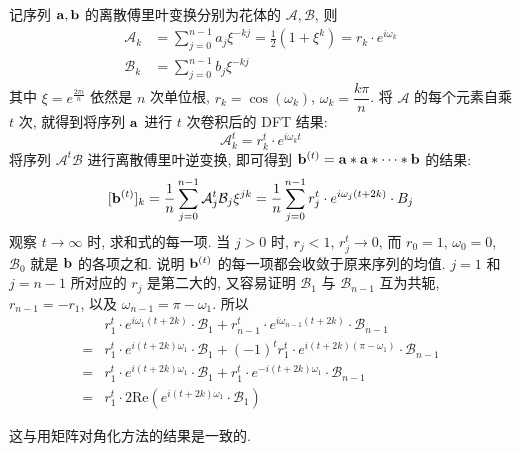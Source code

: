 记序列 $\bold{a}, \bold{b}$ 的离散傅里叶变换分别为花体的 $\mathcal{A}, \mathcal{B}$, 则
\begin{align*}
\mathcal{A}_k &= \sum_{j=0}^{n-1}{a_j \xi^{-kj}} = \frac{1}{2}(1+\xi^k) = r_k \cdot e^{i\omega_k} \\
\mathcal{B}_k &= \sum_{j=0}^{n-1}{b_j \xi^{-kj}}
\end{align*}
其中 $\xi = e^{\frac{2\pi i}{n}}$ 依然是 $n$ 次单位根, $r_k=\cos(\omega_k)$, $\omega_k=\dfrac{k\pi}{n}$. 将 $\mathcal{A}$ 的每个元素自乘 $t$ 次, 就得到将序列 $\bold{a}$ 进行 $t$ 次卷积后的 DFT 结果:
$$ \mathcal{A}_k^t =  r_k^t\cdot e^{i\omega_kt} $$
将序列 $\mathcal{A}^t \mathcal{B}$ 进行离散傅里叶逆变换, 即可得到 $ \bold{b}^{(t)} = \bold{a}*\bold{a}*\cdots *\bold{b}$ 的结果:
\[
[\bold{b}^{(t)}]_k = \frac{1}{n}\sum_{j=0}^{n-1}{ \mathcal{A}_j^t\mathcal{B}_j\xi^{jk} } = \frac{1}{n}\sum_{j=0}^{n-1}{ r_j^t \cdot e^{i\omega_j (t+2k)} \cdot B_j } 
\]
观察 $t\to\infty$ 时, 求和式的每一项. 当 $j>0$ 时, $r_j < 1$, $r_j^t\to 0$, 而 $r_0 = 1$, $\omega_0=0$, $\mathcal{B}_0$ 就是 $\bold{b}$ 的各项之和. 说明 $\bold{b}^{(t)}$ 的每一项都会收敛于原来序列的均值.
$j=1$ 和 $j=n-1$ 所对应的 $r_j$ 是第二大的, 又容易证明 $\mathcal{B}_1$ 与 $\mathcal{B}_{n-1}$ 互为共轭, $r_{n-1}=-r_1$, 以及 $\omega_{n-1} = \pi - \omega_1 $. 所以
\begin{align*}
& r_1^t\cdot e^{i\omega_1(t+2k)} \cdot \mathcal{B}_1 + r_{n-1}^t\cdot e^{i\omega_{n-1}(t+2k)} \cdot \mathcal{B}_{n-1}\\
= & r_1^t\cdot e^{i(t+2k)\omega_1} \cdot \mathcal{B}_1 + (-1)^t r_1^t \cdot e^{i(t+2k)(\pi-\omega_1)} \cdot \mathcal{B}_{n-1} \\
= & r_1^t\cdot e^{i(t+2k)\omega_1} \cdot \mathcal{B}_1 + r_1^t\cdot e^{-i(t+2k)\omega_1} \cdot \mathcal{B}_{n-1}\\
=& r_1^t\cdot 2\mathrm{Re}\left( e^{i(t+2k)\omega_1} \cdot \mathcal{B}_1 \right)
\end{align*}

这与用矩阵对角化方法的结果是一致的.










